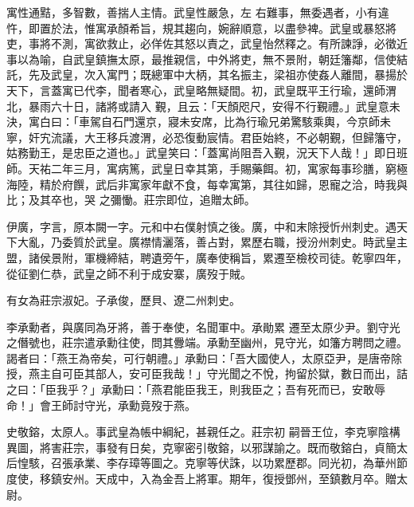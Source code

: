 \begin{pinyinscope}
 寓性通黠，多智數，善揣人主情。武皇性嚴急，左
 右難事，無委遇者，小有違忤，即置於法，惟寓承顏希旨，規其趨向，婉辭順意，以盡參裨。武皇或暴怒將吏，事將不測，寓欲救止，必佯佐其怒以責之，武皇怡然釋之。有所諫諍，必徵近事以為喻，自武皇鎮撫太原，最推親信，中外將吏，無不景附，朝廷籓鄰，信使結託，先及武皇，次入寓門；既總軍中大柄，其名振主，梁祖亦使姦人離間，暴揚於天下，言蓋寓已代李，聞者寒心，武皇略無疑間。初，武皇既平王行瑜，還師渭北，暴雨六十日，諸將或請入
 覲，且云：「天顏咫尺，安得不行覲禮。」武皇意未決，寓白曰：「車駕自石門還京，寢未安席，比為行瑜兄弟驚駭乘輿，今京師未寧，奸宄流議，大王移兵渡渭，必恐復動宸情。君臣始終，不必朝覲，但歸籓守，姑務勤王，是忠臣之道也。」武皇笑曰：「蓋寓尚阻吾入覲，況天下人哉！」即日班師。天祐二年三月，寓病篤，武皇日幸其第，手賜藥餌。初，寓家每事珍膳，窮極海陸，精於府饌，武后非寓家年獻不食，每幸寓第，其往如歸，恩寵之洽，時我與比；及其卒也，哭
 之彌慟。莊宗即位，追贈太師。



 伊廣，字言，原本闕一字。元和中右僕射慎之後。廣，中和末除授忻州刺史。遇天下大亂，乃委質於武皇。廣襟情灑落，善占對，累歷右職，授汾州刺史。時武皇主盟，諸侯景附，軍機締結，聘遺旁午，廣奉使稱旨，累遷至檢校司徒。乾寧四年，從征劉仁恭，武皇之師不利于成安寨，廣歿于賊。



 有女為莊宗淑妃。子承俊，歷貝、遼二州刺史。



 李承勳者，與廣同為牙將，善于奉使，名聞軍中。承勛累
 遷至太原少尹。劉守光之僭號也，莊宗遣承勳往使，問其釁端。承勳至幽州，見守光，如籓方聘問之禮。謁者曰：「燕王為帝矣，可行朝禮。」承勳曰：「吾大國使人，太原亞尹，是唐帝除授，燕主自可臣其部人，安可臣我哉！」守光聞之不悅，拘留於獄，數日而出，詰之曰：「臣我乎？」承勳曰：「燕君能臣我王，則我臣之；吾有死而已，安敢辱命！」會王師討守光，承勳竟歿于燕。



 史敬鎔，太原人。事武皇為帳中綱紀，甚親任之。莊宗初
 嗣晉王位，李克寧陰構異圖，將害莊宗，事發有日矣，克寧密引敬鎔，以邪謀諭之。既而敬鎔白，貞簡太后惶駭，召張承業、李存璋等圖之。克寧等伏誅，以功累歷郡。同光初，為華州節度使，移鎮安州。天成中，入為金吾上將軍。期年，復授鄧州，至鎮數月卒。贈太尉。



\end{pinyinscope}